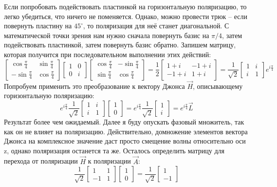 Если попробовать подействовать пластинкой на горизонтальную поляризацию, то легко убедиться, что ничего не поменяется. Однако, можно провести трюк -- если повернуть пластину на $45^{\circ}$, то поляризация для неё станет диагональной. С математической точки зрения нам нужно сначала повернуть базис на $\pi/4$, затем подействовать пластинкой, затем повернуть базис обратно. Запишем матрицу, которая получится при последовательном выполнении этих действий:
\[
\begin{bmatrix} \cos \frac{\pi}{4} & \sin \frac{\pi}{4} \\ -\sin \frac{\pi}{4} & \cos \frac{\pi}{4} \end{bmatrix} \begin{bmatrix} 1 & 0 \\ 0 & i \end{bmatrix} \begin{bmatrix} \cos \frac{\pi}{4} & -\sin \frac{\pi}{4} \\ \sin \frac{\pi}{4} & \cos \frac{\pi}{4} \end{bmatrix} = \frac{1}{2} \begin{bmatrix} 1 + i& -1 + i \\ -1 + i & 1 + i \end{bmatrix} = \frac{1}{\sqrt{2}}\begin{bmatrix} 1 & i \\ i & 1 \end{bmatrix}e^{i\frac{\pi}{4}}
\]
Попробуем применить это преобразование к вектору Джонса $\Vec{H}$, описывающему горизонтальную поляризацию:
\[
e^{i\frac{\pi}{4}}\frac{1}{\sqrt{2}}\begin{bmatrix} 1 & i \\ i & 1 \end{bmatrix}\begin{bmatrix} 1  \\ 0 \end{bmatrix} = e^{i\frac{\pi}{4}}\frac{1}{\sqrt{2}}\begin{bmatrix} 1  \\ i \end{bmatrix} = e^{i\frac{\pi}{4}}\Vec{L}
\]
Результат более чем ожидаемый. Далее я буду опускать фазовый множитель, так как он не влияет на поляризацию. Действительно, домножение элементов вектора Джонса на комплексное значение даст просто смещение волны относительно оси z, однако поляризация останется та же. Осталось определить матрицу для перехода от поляризации $\Vec{H}$ к поляризации $\Vec{A}$:
\[
\frac{1}{\sqrt{2}}\begin{bmatrix} 1 & 1 \\ -1 & 1 \end{bmatrix}\begin{bmatrix} 1  \\ 0 \end{bmatrix} = \frac{1}{\sqrt{2}}\begin{bmatrix} 1  \\ -1 \end{bmatrix}
\]
